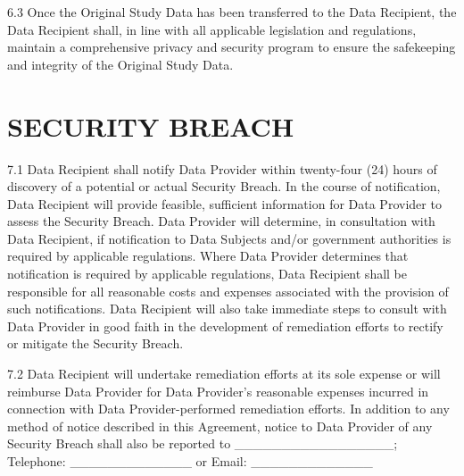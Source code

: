 {\begin{enumerate}
6.3 Once the Original Study Data has been transferred to the Data Recipient, the Data Recipient shall, in line with all applicable legislation and regulations, maintain a comprehensive privacy and security program to ensure the safekeeping and integrity of the Original Study Data.




\section{SECURITY BREACH}

7.1 Data Recipient shall notify Data Provider within twenty-four (24) hours of discovery of a potential or actual Security Breach. In the course of notification, Data Recipient will provide feasible, sufficient information for Data Provider to assess the Security Breach. Data Provider will determine, in consultation with Data Recipient, if notification to Data Subjects and/or government authorities is required by applicable regulations. Where Data Provider determines that notification is required by applicable regulations, Data Recipient shall be responsible for all reasonable costs and expenses associated with the provision of such notifications. Data Recipient will also take immediate steps to consult with Data Provider in good faith in the development of remediation efforts to rectify or mitigate the Security Breach.

7.2 Data Recipient will undertake remediation efforts at its sole expense or will reimburse Data Provider for Data Provider's reasonable expenses incurred in connection with Data Provider-performed remediation efforts. In addition to any method of notice described in this Agreement, notice to Data Provider of any Security Breach shall also be reported to \_\_\_\_\_\_\_\_\_\_\_\_\_\_\_\_\_; Telephone: \_\_\_\_\_\_\_\_\_\_\_\_\_ or Email: \_\_\_\_\_\_\_\_\_\_\_\_\_


\end{enumerate}}
